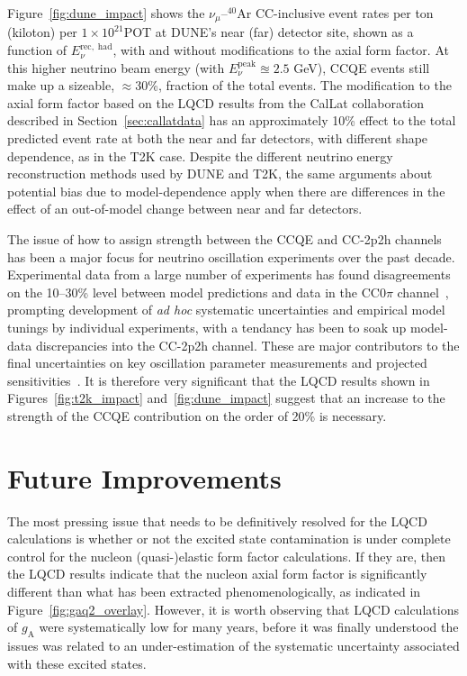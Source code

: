 \documentclass{ar-1col}
\newcommand{\change}[1]{{\color{red} #1}}
\begin{document}
Figure~\ref{fig:dune_impact} shows the $\nu_{\mu}$--$^{40}$Ar CC-inclusive event rates per ton (kiloton) per $1\times10^{21}$POT at DUNE's near (far) detector site, shown as a function of $E^{\mathrm{rec,\;had}}_{\nu}$, with and without modifications to the axial form factor. At this higher neutrino beam energy (with $E_{\nu}^{\mathrm{peak}} \approxeq 2.5$ GeV), CCQE events still make up a sizeable, $\approx$30\%, fraction of the total events. The modification to the axial form factor based on the LQCD results from the CalLat collaboration described in Section~\ref{sec:callatdata} has an approximately 10\% effect to the total predicted event rate at both the near and far detectors, with different shape dependence, as in the T2K case. Despite the different neutrino energy reconstruction methods used by DUNE and T2K, the same arguments about potential bias due to model-dependence apply when there are differences in the effect of an out-of-model change between near and far detectors.

The issue of how to assign strength between the CCQE and CC-2p2h channels has been a major focus for neutrino oscillation experiments over the past decade. Experimental data from a large number of experiments has found disagreements on the 10--30\% level between model predictions and data in the CC$0\pi$ channel~\cite{garvey_review_2014, Mosel:2016cwa, NuSTEC:2017hzk, Katori:2016yel, ParticleDataGroup:2020ssz}, prompting development of {\it ad hoc} systematic uncertainties and empirical model tunings by individual experiments, with a tendancy has been to soak up model-data discrepancies into the CC-2p2h channel. These are major contributors to the final uncertainties on key oscillation parameter measurements and projected sensitivities~\cite{T2K:2019bcf, DUNE:2020jqi, T2K:2021xwb, NOvA:2021nfi, DUNE:2021mtg}. It is therefore very significant that the LQCD results shown in Figures~\ref{fig:t2k_impact} and~\ref{fig:dune_impact} suggest that an increase to the strength of the CCQE contribution on the order of 20\% is necessary.


\section{Future Improvements\label{sec:future}}

The most pressing issue \change{that needs to be} definitively \change{resolved for} the LQCD calculations is whether or not the excited state contamination is under complete control for the nucleon (quasi-)elastic form factor calculations.
If they are, then the LQCD results indicate that the nucleon axial form factor is significantly different than what has been extracted phenomenologically, as indicated in Figure~\ref{fig:gaq2_overlay}.
However, it is worth observing that LQCD calculations of $g_{\mathrm{A}}$ were systematically low for many years, before it was finally understood the issues was related to an under-estimation of the systematic uncertainty associated with these excited states.
\end{document}

